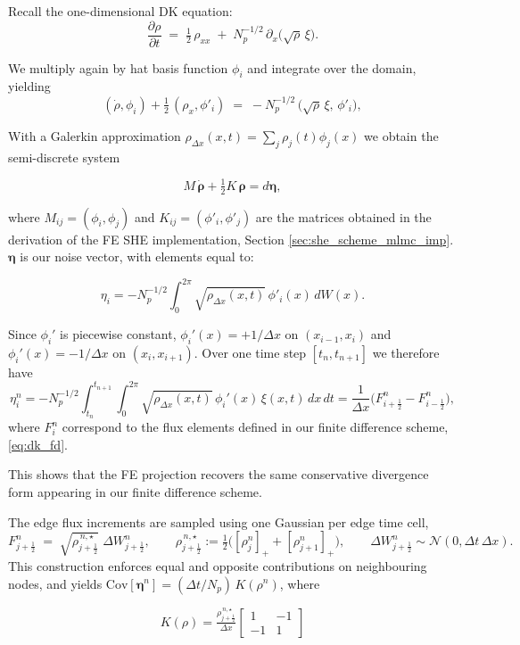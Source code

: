 Recall the one-dimensional DK equation:
\[
\frac{\partial \rho}{\partial t} \;=\; \tfrac{1}{2}\,\rho_{xx}
\;+\; N_p^{-1/2}\,\partial_x\!\big(\sqrt{\rho}\,\xi\big).
\]

We multiply again by hat basis function $\phi_i$ and integrate over the domain, yielding
\[
\left(\dot\rho,\phi_i\right) + \tfrac{1}{2}\,(\rho_x,\phi'_i)
\;=\; -N_p^{-1/2}\,\big(\sqrt{\rho}\,\xi,\,\phi'_i\big),
\]

With a Galerkin approximation 
$\rho_{\Delta x}(x,t)=\sum_j \rho_j(t)\phi_j(x)$ we obtain the semi-discrete system

\[
M\,\dot{\boldsymbol{\rho}} + \tfrac{1}{2}K\,\boldsymbol{\rho} = d\boldsymbol{\eta},
\]

where $M_{ij}=(\phi_i,\phi_j)$ and $K_{ij}=(\phi'_i,\phi'_j)$ are the matrices 
obtained in the derivation of the FE SHE implementation, 
Section \ref{sec:she_scheme_mlmc_imp}.
$\boldsymbol{\eta}$ is our noise vector, with elements equal to:

\[
\eta_i = -N_p^{-1/2}\int_0^{2\pi}\sqrt{\rho_{\Delta x}(x,t)}\,\phi'_i(x)\,dW(x).
\]

Since $\phi_i'$ is piecewise constant, $\phi_i'(x)=+1/\Delta x$ on $(x_{i-1},x_i)$ and
$\phi_i'(x)=-1/\Delta x$ on $(x_i,x_{i+1})$. Over one time step $[t_n,t_{n+1}]$ we therefore have
\[
\eta_i^n
= -N_p^{-1/2}\!\int_{t_n}^{t_{n+1}}\!\!\int_0^{2\pi}\!\sqrt{\rho_{\Delta x}(x,t)}\,\phi_i'(x)\,\xi(x,t)\,dx\,dt
= \frac{1}{\Delta x}\Big(F_{i+\frac12}^n - F_{i-\frac12}^n\Big),
\]
where $F_i^n$ correspond to the flux elements defined in our finite difference scheme, \eqref{eq:dk_fd}. 

This shows that the FE projection recovers the same conservative divergence form
appearing in our finite difference scheme.


The edge flux increments are sampled using one Gaussian per edge time cell,
\[
F_{j+\frac12}^n \;=\; \sqrt{\rho_{j+\frac12}^{\,n,\star}}\;\Delta W_{j+\frac12}^n,
\qquad
\rho_{j+\frac12}^{\,n,\star}:=\tfrac12\!\big([\rho_j^n]_+ + [\rho_{j+1}^n]_+\big),
\qquad
\Delta W_{j+\frac12}^n \sim \mathcal N(0,\Delta t\,\Delta x).
\]
This construction enforces equal and opposite contributions on neighbouring nodes, 
and yields $\mathrm{Cov}[\boldsymbol{\eta}^n] = (\Delta t/N_p)\,K(\rho^n)$, 
where 

\begin{equation*} 
    K(\rho) =  
    \tfrac{\rho_{j+\frac12}^{\,n,\star}}{\Delta x}
    \!\begin{bmatrix}1&-1\\-1&1\end{bmatrix}
\end{equation*} 

